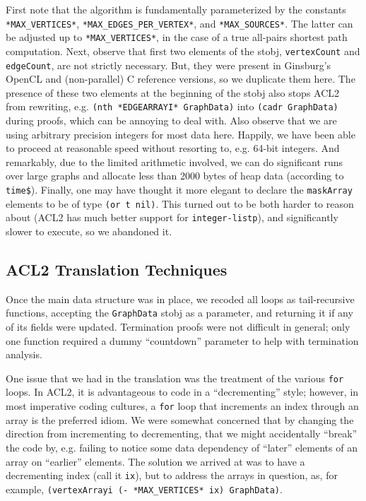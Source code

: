 \documentclass[copyright]{eptcs}
\begin{document}
First note that the algorithm is fundamentally parameterized by the constants
\texttt{*MAX\_VERTICES*}, \texttt{*MAX\_EDGES\_PER\_VERTEX*}, and
\texttt{*MAX\_SOURCES*}.  The latter can be adjusted up to
\texttt{*MAX\_VERTICES*}, in the case of a true all-pairs shortest path
computation.  Next, observe that first two elements of the stobj,
\texttt{vertexCount} and \texttt{edgeCount}, are not strictly
necessary.  But, they were present in Ginsburg's OpenCL and
(non-parallel) C reference versions, so we duplicate them here.  The 
presence of these two elements at the beginning of the stobj 
also stops ACL2 from rewriting, e.g. 
\texttt{(nth *EDGEARRAYI*  GraphData)} into 
\texttt{(cadr GraphData)} during proofs, which 
can be annoying to deal with.  Also observe that we are using arbitrary precision
integers for most data here.  Happily, we have been able to proceed at
reasonable speed without resorting to, e.g. 64-bit integers.  And
remarkably, due to the limited arithmetic involved, we can do
significant runs over large graphs and allocate less than 2000 bytes
of heap data (according to \texttt{time\$}).  Finally,
one may have thought it more elegant to declare the \texttt{maskArray}
elements to be of type \texttt{(or t nil)}.  This turned out to be
both harder to reason about (ACL2 has much better support for 
\texttt{integer-listp}), and significantly slower to execute, so
we abandoned it.

\subsection{ACL2 Translation Techniques}

Once the main data structure was in place, we recoded all loops 
as tail-recursive functions, accepting the \texttt{GraphData} stobj as
a parameter, and returning it if any of its fields were updated.  
Termination proofs were not difficult in general; only one function 
required a dummy ``countdown'' parameter to help with termination analysis.  

One issue that we had in the translation was the treatment of the
various \texttt{for} loops.  In ACL2, it is advantageous to code in a
``decrementing'' style; however, in most imperative coding cultures, 
a \texttt{for} loop that increments an index through an array is the
preferred idiom.  We were somewhat concerned that by changing the 
direction from incrementing to decrementing, that we might
accidentally ``break'' the code by, e.g. failing to notice some data 
dependency of ``later'' elements of an array on ``earlier'' elements.  
The solution we arrived at was to have a decrementing index (call it 
\texttt{ix}), but to address the arrays in question, as, for example, 
\texttt{(vertexArrayi (- *MAX\_VERTICES* ix) GraphData)}.
\end{document}
